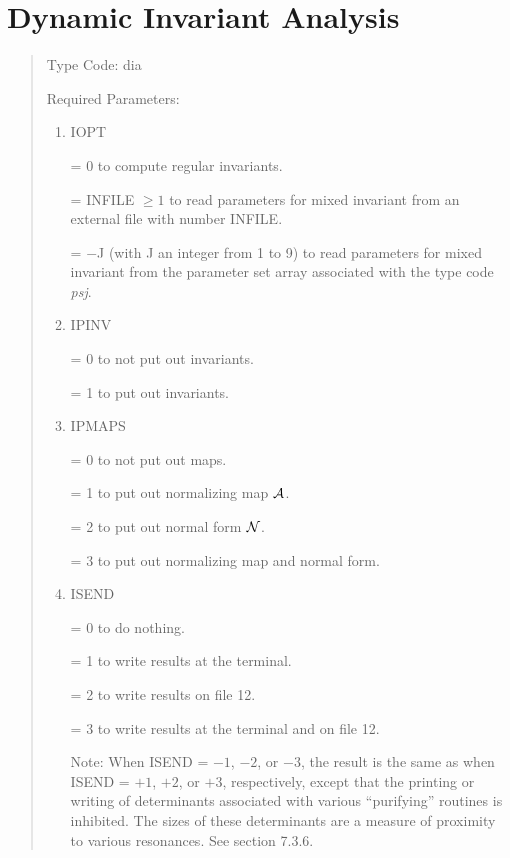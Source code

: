 \section{Dynamic Invariant Analysis}
\begin{quotation}
\noindent     Type Code:  dia
\vspace{5mm}

\noindent Required Parameters:
\begin{enumerate}
      \item  IOPT

             = 0 to compute regular invariants.

             = INFILE $\geq 1$ to read parameters for mixed invariant from an
               external file \hspace*{1em}with number INFILE.

             = $-$J (with J an integer from 1 to 9) to read parameters for
               mixed invariant \hspace*{1em}from the parameter set array associated with
               the type code {\em psj}.

      \item  IPINV

               = 0 to not put out invariants.

               = 1 to put out invariants.

      \item  IPMAPS

             = 0 to not put out maps.

             = 1 to put out normalizing map ${\cal A}$.

             = 2 to put out normal form ${\cal N}$.

             = 3 to put out normalizing map and normal form.

      \item  ISEND

             = 0 to do nothing.

             = 1 to write results at the terminal.

             = 2 to write results on file 12.

             = 3 to write results at the terminal and on file 12.

             Note:  When ISEND = $-1$, $-2$, or $-3$, the result is the same as
             when ISEND = $+1$, $+2$, or $+3$, respectively, except that the
             printing or writing of determinants associated with various
             ``purifying'' routines is inhibited.  The sizes of these
             determinants are a measure of proximity to various resonances.  See section 7.3.6.


\end{enumerate}
\end{quotation}
